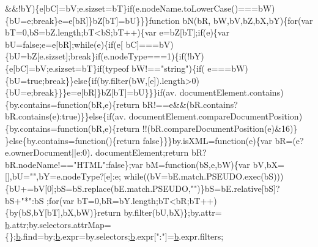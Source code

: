 \begin{DoxyCode}
      &&!bY)\{e[bC]=bV;e.sizset=bT\}\textcolor{keywordflow}{if}(e.nodeName.toLowerCase()===bW)\{bU=e;\textcolor{keywordflow}{break}\}e=e[bR]\}bZ[bT]=bU\}\}\}\textcolor{keyword}{function} bN(bR,
      bW,bV,bZ,bX,bY)\{\textcolor{keywordflow}{for}(var bT=0,bS=bZ.length;bT<bS;bT++)\{var e=bZ[bT];\textcolor{keywordflow}{if}(e)\{var bU=\textcolor{keyword}{false};e=e[bR];\textcolor{keywordflow}{while}(e)\{\textcolor{keywordflow}{if}(e[
      bC]===bV)\{bU=bZ[e.sizset];\textcolor{keywordflow}{break}\}\textcolor{keywordflow}{if}(e.nodeType===1)\{\textcolor{keywordflow}{if}(!bY)\{e[bC]=bV;e.sizset=bT\}\textcolor{keywordflow}{if}(typeof bW!==\textcolor{stringliteral}{"string"})\{\textcolor{keywordflow}{if}(
      e===bW)\{bU=\textcolor{keyword}{true};\textcolor{keywordflow}{break}\}\}\textcolor{keywordflow}{else}\{\textcolor{keywordflow}{if}(by.filter(bW,[e]).length>0)\{bU=e;\textcolor{keywordflow}{break}\}\}\}e=e[bR]\}bZ[bT]=bU\}\}\}\textcolor{keywordflow}{if}(av.
      documentElement.contains)\{by.contains=\textcolor{keyword}{function}(bR,e)\{\textcolor{keywordflow}{return} bR!==e&&(bR.contains?bR.contains(e):\textcolor{keyword}{true})\}\}\textcolor{keywordflow}{else}\{\textcolor{keywordflow}{if}(av.
      documentElement.compareDocumentPosition)\{by.contains=\textcolor{keyword}{function}(bR,e)\{\textcolor{keywordflow}{return} !!(bR.compareDocumentPosition(e)&16)\}
      \}\textcolor{keywordflow}{else}\{by.contains=\textcolor{keyword}{function}()\{\textcolor{keywordflow}{return} \textcolor{keyword}{false}\}\}\}by.isXML=\textcolor{keyword}{function}(e)\{var bR=(e?e.ownerDocument||e:0).
      documentElement;\textcolor{keywordflow}{return} bR?bR.nodeName!==\textcolor{stringliteral}{"HTML"}:\textcolor{keyword}{false}\};var bM=\textcolor{keyword}{function}(bS,e,bW)\{var bV,bX=[],bU=\textcolor{stringliteral}{""},bY=e.nodeType?[e]:e;\textcolor{keywordflow}{
      while}((bV=bE.match.PSEUDO.exec(bS)))\{bU+=bV[0];bS=bS.replace(bE.match.PSEUDO,\textcolor{stringliteral}{""})\}bS=bE.relative[bS]?bS+\textcolor{stringliteral}{"*"}:bS
      ;\textcolor{keywordflow}{for}(var bT=0,bR=bY.length;bT<bR;bT++)\{by(bS,bY[bT],bX,bW)\}\textcolor{keywordflow}{return} by.filter(bU,bX)\};by.attr=
      \hyperlink{docs_2_programmer's_manual_2html_2jquery_8js_aa4026ad5544b958e54ce5e106fa1c805}{b}.attr;by.selectors.attrMap=\{\};\hyperlink{docs_2_programmer's_manual_2html_2jquery_8js_aa4026ad5544b958e54ce5e106fa1c805}{b}.find=by;\hyperlink{docs_2_programmer's_manual_2html_2jquery_8js_aa4026ad5544b958e54ce5e106fa1c805}{b}.expr=by.selectors;\hyperlink{docs_2_programmer's_manual_2html_2jquery_8js_aa4026ad5544b958e54ce5e106fa1c805}{b}.expr[\textcolor{stringliteral}{":"}]=\hyperlink{docs_2_programmer's_manual_2html_2jquery_8js_aa4026ad5544b958e54ce5e106fa1c805}{b}.expr.filters;

\end{DoxyCode}
